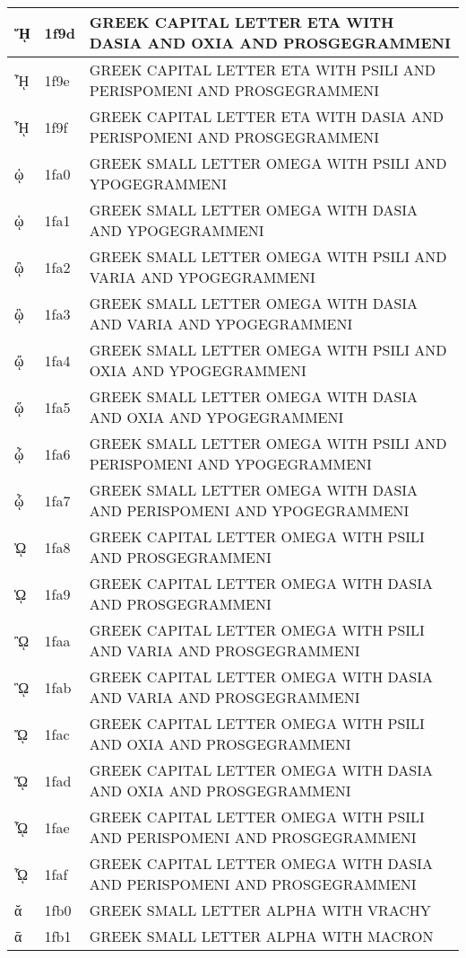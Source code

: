 \documentclass[12pt,letterpaper,openany]{book}
\begin{document}
\begin{center}
\begin{supertabular}{|m{0.25in}|m{0.5in}|m{4in}|}
			ᾝ & 1f9d & GREEK CAPITAL LETTER ETA WITH DASIA AND OXIA AND PROSGEGRAMMENI\\\hline
			ᾞ & 1f9e & GREEK CAPITAL LETTER ETA WITH PSILI AND PERISPOMENI AND PROSGEGRAMMENI\\\hline
			ᾟ & 1f9f & GREEK CAPITAL LETTER ETA WITH DASIA AND PERISPOMENI AND PROSGEGRAMMENI\\\hline
			ᾠ & 1fa0 & GREEK SMALL LETTER OMEGA WITH PSILI AND YPOGEGRAMMENI\\\hline
			ᾡ & 1fa1 & GREEK SMALL LETTER OMEGA WITH DASIA AND YPOGEGRAMMENI\\\hline
			ᾢ & 1fa2 & GREEK SMALL LETTER OMEGA WITH PSILI AND VARIA AND YPOGEGRAMMENI\\\hline
			ᾣ & 1fa3 & GREEK SMALL LETTER OMEGA WITH DASIA AND VARIA AND YPOGEGRAMMENI\\\hline
			ᾤ & 1fa4 & GREEK SMALL LETTER OMEGA WITH PSILI AND OXIA AND YPOGEGRAMMENI\\\hline
			ᾥ & 1fa5 & GREEK SMALL LETTER OMEGA WITH DASIA AND OXIA AND YPOGEGRAMMENI\\\hline
			ᾦ & 1fa6 & GREEK SMALL LETTER OMEGA WITH PSILI AND PERISPOMENI AND YPOGEGRAMMENI\\\hline
			ᾧ & 1fa7 & GREEK SMALL LETTER OMEGA WITH DASIA AND PERISPOMENI AND YPOGEGRAMMENI\\\hline
			ᾨ & 1fa8 & GREEK CAPITAL LETTER OMEGA WITH PSILI AND PROSGEGRAMMENI\\\hline
			ᾩ & 1fa9 & GREEK CAPITAL LETTER OMEGA WITH DASIA AND PROSGEGRAMMENI\\\hline
			ᾪ & 1faa & GREEK CAPITAL LETTER OMEGA WITH PSILI AND VARIA AND PROSGEGRAMMENI\\\hline
			ᾫ & 1fab & GREEK CAPITAL LETTER OMEGA WITH DASIA AND VARIA AND PROSGEGRAMMENI\\\hline
			ᾬ & 1fac & GREEK CAPITAL LETTER OMEGA WITH PSILI AND OXIA AND PROSGEGRAMMENI\\\hline
			ᾭ & 1fad & GREEK CAPITAL LETTER OMEGA WITH DASIA AND OXIA AND PROSGEGRAMMENI\\\hline
			ᾮ & 1fae & GREEK CAPITAL LETTER OMEGA WITH PSILI AND PERISPOMENI AND PROSGEGRAMMENI\\\hline
			ᾯ & 1faf & GREEK CAPITAL LETTER OMEGA WITH DASIA AND PERISPOMENI AND PROSGEGRAMMENI\\\hline
			ᾰ & 1fb0 & GREEK SMALL LETTER ALPHA WITH VRACHY\\\hline
			ᾱ & 1fb1 & GREEK SMALL LETTER ALPHA WITH MACRON\\\hline

\end{supertabular}
\end{center}
\end{document}
